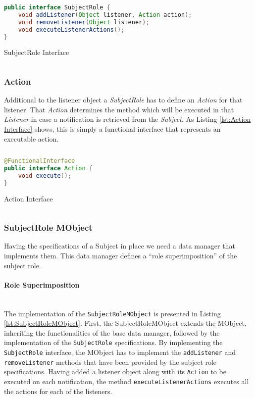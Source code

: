 \begin{sourcecode} [H]
	\begin{lstlisting}[language=Java, escapechar=|]
public interface SubjectRole {
	void addListener(Object listener, Action action);
	void removeListener(Object listener);
	void executeListenerActions();
}
	\end{lstlisting}
	\caption{SubjectRole Interface}
	\label{lst:SubjectRole Interface}
\end{sourcecode}

\subsubsection{Action}
Additional to the listener object a \textit{SubjectRole} has to define an \textit{Action} for that listener.
That \textit{Action} determines the method which will be executed in that \textit{Listener} in case a notification is retrieved from the \textit{Subject}.
As Listing \ref{lst:Action Interface} shows, this is simply a functional interface that represents an executable action.

\begin{sourcecode} [H]
	\begin{lstlisting}[language=Java, escapechar=|]
@FunctionalInterface
public interface Action {
	void execute();
}
	\end{lstlisting}
	\caption{Action Interface}
	\label{lst:Action Interface}
\end{sourcecode}

\subsubsection{SubjectRole MObject}
Having the specifications of a Subject in place we need a data manager that implements them.
This data manager defines a ``role superimposition'' of the subject role.

\paragraph{Role Superimposition}\mbox{}\\
The implementation of the \texttt{SubjectRoleMObject} is presented in Listing \ref{lst:SubjectRoleMObject}.
First, the SubjectRoleMObject extends the MObject, inheriting the functionalities of the base data manager, followed by the implementation of the \texttt{SubjectRole} specifications.
By implementing the \texttt{SubjectRole} interface, the MObject has to implement the \texttt{addListener} and \texttt{removeListener} methods that have been provided by the subject role specifications.
Having added a listener object along with its \texttt{Action} to be executed on each notification, the method \texttt{executeListenerActions} executes all the actions for each of the listeners.

